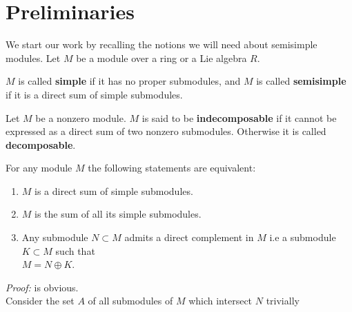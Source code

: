 \section{Preliminaries}
We start our work by recalling the notions we will need about semisimple modules. Let $M$ be a module over a ring or a Lie algebra $R$.
\begin{defn}
$M$ is called \textbf{simple} if it has no proper submodules, and $M$ is called \textbf{semisimple} if it is a direct sum of simple submodules.
\end{defn}
\begin{defn}
Let $M$ be a nonzero module. $M$ is said to be \textbf{indecomposable} if
it cannot be expressed as a direct sum of two nonzero submodules. Otherwise it is called \textbf{decomposable}.
\end{defn}

\begin{thm}For any module $M$ the following statements are equivalent:
\begin{enumerate}[label=(\arabic*),ref=(\arabic*)]
\item $M$ is a direct sum of simple submodules.\label{statement1}
\item{ $M$ is the sum of all its simple submodules.}\label{statement2}
\item {Any submodule $N\subset M$ admits a direct complement in $M$ i.e  a submodule $K\subset M$} such that 
\\$M=N \oplus K.$\label{statement3}
\end{enumerate}
\end{thm}
\emph{Proof:}  is obvious.
\\
 Consider the set  $A$ of all submodules  of $M$ which intersect $N$ trivially

